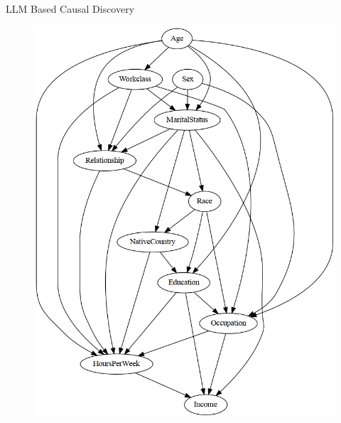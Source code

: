 \documentclass{beamer}
\begin{document}
\begin{frame}{LLM Based Causal Discovery}
	\begin{figure}
		\centering
		\includegraphics[scale=0.3]{imgs/adult_llm.png}
	\end{figure}
\end{frame}

% 
\end{document}
